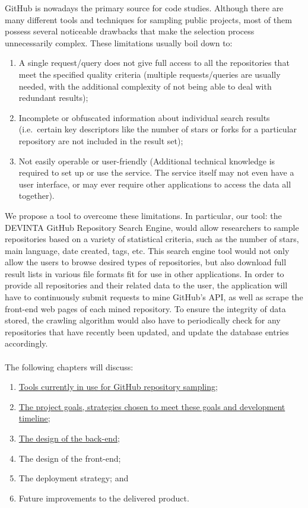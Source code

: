 GitHub is nowadays the primary source for code studies.
Although there are many different tools and techniques for sampling public projects, most of them possess several noticeable drawbacks that make the selection process unnecessarily complex.
These limitations usually boil down to:
\begin{enumerate}
    \item A single request/query does not give full access to all the repositories that meet the specified quality criteria (multiple requests/queries are usually needed, with the additional complexity of not being able to deal with redundant results);
    \item Incomplete or obfuscated information about individual search results (i.e.\ certain key descriptors like the number of stars or forks for a particular repository are not included in the result set);
    \item Not easily operable or user-friendly (Additional technical knowledge is required to set up or use the service. The service itself may not even have a user interface, or may ever require other applications to access the data all together).
\end{enumerate}

\newpage

We propose a tool to overcome these limitations.
In particular, our tool: the DEVINTA GitHub Repository Search Engine, would allow researchers to sample repositories based on a variety of statistical criteria, such as the number of stars, main language, date created, tags, etc.
This search engine tool would not only allow the users to browse desired types of repositories, but also download full result lists in various file formats fit for use in other applications.
In order to provide all repositories and their related data to the user, the application will have to continuously submit requests to mine GitHub's API, as well as scrape the front-end web pages of each mined repository.
To ensure the integrity of data stored, the crawling algorithm would also have to periodically check for any repositories that have recently been updated, and update the database entries accordingly.
\\\\
\noindent
The following chapters will discuss:
\begin{enumerate}
    \item \hyperref[ch:2]{Tools currently in use for GitHub repository sampling};
    \item \hyperref[ch:3]{The project goals, strategies chosen to meet these goals and development timeline};
    \item \hyperref[ch:4]{The design of the back-end};
    \item The design of the front-end;
    \item The deployment strategy; and
    \item Future improvements to the delivered product.
\end{enumerate}